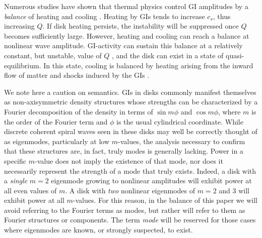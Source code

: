 \documentclass[manuscript]{aastex}
\newcommand{\ACBc}[1]{{\color{red} #1}}
\begin{document}
Numerous studies have shown that thermal physics control GI amplitudes by a {\it balance} of heating and cooling \citep[e.g.,][]{tomley1991,tomley1994,pickett1998,pickett2000, pickett2003,gammie2001,boss2002,rice2003b,mejia2005,boley2006,boley2007, stamatellos2008,cossins2009}.
Heating by GIs tends to increase $c_s$, thus increasing $Q$. If disk heating persists, the instability will be suppressed once $Q$ becomes sufficiently large.  However, heating and cooling can reach a balance at nonlinear wave amplitude. GI-activity can sustain this balance  at a relatively constant,
but unstable, value of $Q$ \citep{paczynski1978, lin1981,goldreich1965}, and 
the disk can exist in a state of quasi-equilibrium. In this state, cooling is 
balanced by heating arising from the inward flow of matter and shocks induced by the GIs
\citep{gammie2001, lodato2004, rice2005, boley2006, cossins2009, vorobyov2010}.


We note here a caution on semantics.  GIs in disks commonly manifest themselves  as non-axisymmetric density structures whose strengths can be characterized 
by a Fourier decomposition of the density in terms of $\sin m\phi$ and $\cos m\phi$, where 
$m$ is the order of the Fourier term and $\phi$ is the usual 
cylindrical coordinate.  While discrete coherent spiral waves seen in these  disks may well be correctly thought of as eigenmodes, particularly 
at low $m$-values, the analysis necessary to confirm that these structures are, in fact, truly modes is generally lacking.
Power in a specific $m$-value does not imply the existence of that mode, nor does it necessarily represent the strength of a mode that truly exists.  Indeed, a disk with a {\it single} $m = 2$ eigenmode growing to nonlinear amplitudes will exhibit power at all even values of $m$.  A disk with {\it two} nonlinear eigenmodes of
$m = 2$ and 3 will exhibit power at all $m$-values.  
For this reason, in the balance of this paper we will avoid referring to the Fourier terms as modes, but rather will refer to them as Fourier structures or components.   The term {\it mode} will be reserved for those cases where eigenmodes are known, or strongly suspected, to exist.
\end{document}
